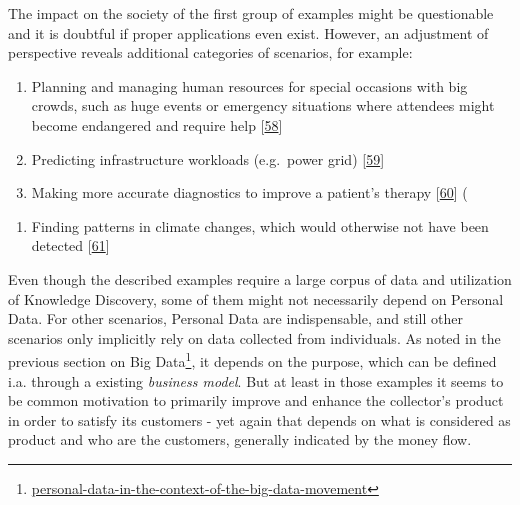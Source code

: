 \documentclass[12pt,english,a4paper,titlepage,cleardoublepage=empty,dottedtoc]{report}
\renewcommand{\href}[2]{#2\footnote{\url{#1}}}
\providecommand{\tightlist}{%
  \setlength{\itemsep}{0pt}\setlength{\parskip}{0pt}}
\begin{document}
The impact on the society of the first group of examples might be
questionable and it is doubtful if proper applications even exist.
However, an adjustment of perspective reveals additional categories of
scenarios, for example:

\begin{enumerate}
\def\labelenumi{(\Alph{enumi})}
\setcounter{enumi}{3}
\item
  Planning and managing human resources for special occasions with big
  crowds, such as huge events or emergency situations where attendees
  might become endangered and require help
  {[}\protect\hyperlink{ref-estimating-the-locations-of-emergency-events-from-twitter-streams_2014}{58}{]}
\item
  Predicting infrastructure workloads (e.g.~power grid)
  {[}\protect\hyperlink{ref-paper_2015_improving-power-grid-monitoring-data-quality-an-efficient-machine-learning-framework-for-missing-data-prediction}{59}{]}
\item
  Making more accurate diagnostics to improve a patient's therapy
  {[}\protect\hyperlink{ref-the-practice-of-predictive-analytics-in-healthcare_2013}{60}{]}
  (
\end{enumerate}

\begin{enumerate}
\def\labelenumi{\Alph{enumi})}
\setcounter{enumi}{6}
\tightlist
\item
  Finding patterns in climate changes, which would otherwise not have
  been detected
  {[}\protect\hyperlink{ref-data-collection-for-climate-changes_2014}{61}{]}
\end{enumerate}

Even though the described examples require a large corpus of data and
utilization of Knowledge Discovery, some of them might not necessarily
depend on Personal Data. For other scenarios, Personal Data are
indispensable, and still other scenarios only implicitly rely on data
collected from individuals. As noted in the
\href{personal-data-in-the-context-of-the-big-data-movement}{previous
section on Big Data}, it depends on the purpose, which can be defined
i.a. through a existing \emph{business model}. But at least in those
examples it seems to be common motivation to primarily improve and
enhance the collector's product in order to satisfy its customers - yet
again that depends on what is considered as product and who are the
customers, generally indicated by the money flow.
\end{document}
